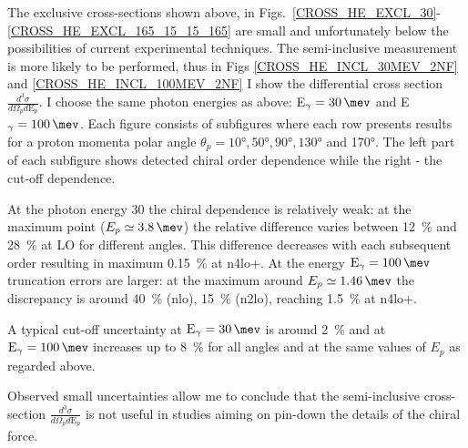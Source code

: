         The exclusive cross-sections shown above, in Figs.~\ref{CROSS_HE_EXCL_30}-\ref{CROSS_HE_EXCL_165_15_15_165}
        are small and unfortunately below the possibilities of current 
        experimental techniques. The semi-inclusive measurement is more likely to be
        performed, thus in Figs \ref{CROSS_HE_INCL_30MEV_2NF} and \ref{CROSS_HE_INCL_100MEV_2NF}
        I show the 
        differential cross section $\frac{d^3\sigma}{d\Omega_p d\text{E}_p}$.
        I choose the same photon energies as above: E$_\gamma = \SI{30}{\mev}$ and
        E$_\gamma = \SI{100}{\mev}$.
        Each figure consists of subfigures where each row presents results
        for a proton momenta polar angle $\theta_p = \ang{10}, \ang{50}, \ang{90}, \ang{130}$ and \ang{170}.
        The left part of each subfigure shows detected
        chiral order dependence while the right - the cut-off dependence.
        
        At the photon energy \SI{30}{\mev} the chiral dependence is relatively weak: at the maximum point
        ($E_p \simeq \SI{3.8}{\mev}$) the relative difference varies between \SI{12}{\percent} and 
        \SI{28}{\percent} at LO for different angles. This difference decreases with each subsequent order
        resulting in maximum \SI{0.15}{\percent} at \gls{n4lo+}. At the energy $\text{E}_\gamma = \SI{100}{\mev}$ truncation errors
        are larger: at the maximum around $E_p \simeq \SI{1.46}{\mev}$ the discrepancy
        is around \SI{40}{\percent} (\gls{nlo}),
        \SI{15}{\percent} (\gls{n2lo}), reaching \SI{1.5}{\percent} at \gls{n4lo+}.

        A typical cut-off uncertainty at $\text{E}_\gamma = \SI{30}{\mev}$ is around \SI{2}{\percent}
        and at $\text{E}_\gamma = \SI{100}{\mev}$ increases up to \SI{8}{\percent} for all angles and 
        at the same values of $E_p$ as regarded above.

        Observed small uncertainties allow me to conclude that the semi-inclusive cross-section
        $\frac{d^3\sigma}{d\Omega_p d\text{E}_p}$ is not useful in studies aiming on
        pin-down the details of the chiral force.


